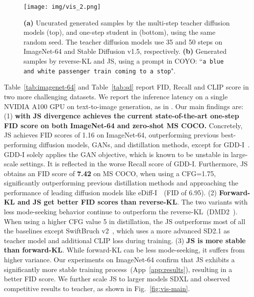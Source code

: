 \begin{figure*}[t]
\centering
\texttt{[image: img/vis\_2.png]}
\vspace{-11pt}
\caption{\textbf{(a)} Uncurated generated samples by the multi-step teacher diffusion models (top), and one-step student in \methodtext (bottom), using the same random seed. The teacher diffusion models use 35 and 50 steps on ImageNet-64 and Stable Diffusion v1.5, respectively. \textbf{(b)} Generated samples by reverse-KL and JS,  using a prompt in COYO: ``\texttt{a blue and white passenger train coming to a stop}".}
\label{fig:vis}
\vspace{-10pt}
\end{figure*}



Table~\ref{tab:imagenet-64} and Table~\ref{tab:sd} report FID, Recall and CLIP score in two more challenging datasets. We report the inference latency on a single NVIDIA A100 GPU on text-to-image generation, as in \cite{yin2024improved}. Our main findings are: (1) \textbf{\methodtext with JS divergence achieves the current state-of-the-art one-step FID score on both ImageNet-64 and zero-shot MS COCO.} Concretely, JS achieves FID scores of 1.16 on ImageNet-64, outperforming previous best-performing diffusion models, GANs, and distillation methods, except for GDD-I~\cite{zheng2024diffusion}. GDD-I solely applies the GAN objective, which is known to be unstable in large-scale settings. It is reflected in the worse Recall score of GDD-I. Furthermore, JS obtains an FID score of {\bf{7.42}} on MS COCO, when using a CFG=1.75, significantly outperforming previous distillation methods and approaching the performance of leading diffusion models like eDiff-I~\cite{balaji2022ediffi}~(FID of 6.95). (2) \textbf{Forward-KL and JS get better FID scores than reverse-KL}. The two variants with less mode-seeking behavior continue to outperform the reverse-KL~(DMD2~\cite{yin2024improved}). 
When using a higher CFG value 5  in distillation, the JS outperforms most of all the baselines except SwiftBruch v2~\cite{dao2025swiftbrush}, which uses a more advanced SD2.1 as teacher model and additional CLIP loss during training.
(3) \textbf{JS is more stable than forward-KL}. While forward-KL can be less mode-seeking, it suffers from higher variance.  Our experiments on ImageNet-64 confirm that JS exhibits a significantly more stable training process~(App~\ref{app:results}), resulting in a better FID score. We further scale JS to larger models SDXL and observed competitive results to teacher, as shown in Fig.~\ref{fig:vis-main}. 



